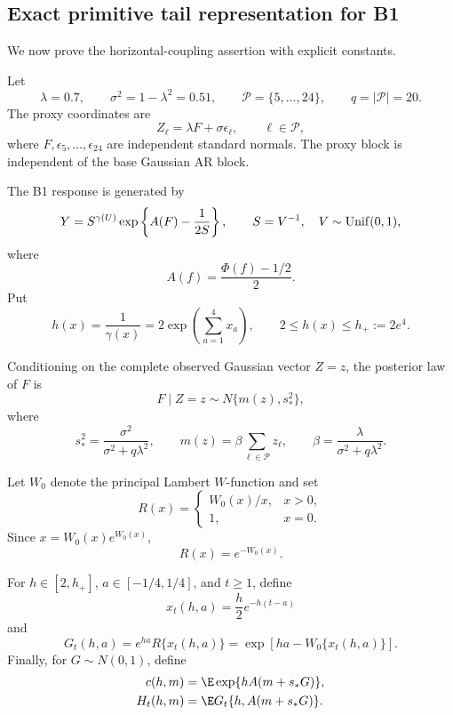 \subsection{Exact primitive tail representation for B1}

We now prove the horizontal-coupling assertion with explicit
constants.

Let
\[
 \lambda=0.7,\qquad
 \sigma^2=1-\lambda^2=0.51,
 \qquad
 \mathcal P=\{5,\ldots,24\},
 \qquad q=|\mathcal P|=20.
\]
The proxy coordinates are
\[
 Z_\ell=\lambda F+\sigma\epsilon_\ell,
 \qquad \ell\in\mathcal P,
\]
where \(F,\epsilon_5,\ldots,\epsilon_{24}\) are independent
standard normals. The proxy block is independent of the base
Gaussian AR block.

The B1 response is generated by
\begin{equation}
 Y
 =
 S^{\gamma(U)}
 \exp\left\{
  A(F)-\frac1{2S}
 \right\},
 \qquad
 S=V^{-1},\quad V\sim{\rm Unif}(0,1),
 \label{eq:B1-generator-rigorous}
\end{equation}
where
\[
 A(f)=\frac{\Phi(f)-1/2}{2}.
\]
Put
\[
 h(x)=\frac1{\gamma(x)}
 =
 2\exp\left(\sum_{a=1}^4x_a\right),
 \qquad
 2\le h(x)\le h_+:=2e^4.
\]

Conditioning on the complete observed Gaussian vector
\(Z=z\), the posterior law of \(F\) is
\begin{equation}
 F\mid Z=z
 \sim N\{m(z),s_*^2\},
 \label{eq:B1-posterior}
\end{equation}
where
\begin{equation}
 s_*^2
 =
 \frac{\sigma^2}{\sigma^2+q\lambda^2},
 \qquad
 m(z)
 =
 \beta\sum_{\ell\in\mathcal P}z_\ell,
 \qquad
 \beta=
 \frac{\lambda}{\sigma^2+q\lambda^2}.
 \label{eq:B1-posterior-parameters}
\end{equation}

Let \(W_0\) denote the principal Lambert \(W\)-function and set
\[
 R(x)=
 \begin{cases}
  W_0(x)/x,&x>0,\\
  1,&x=0.
 \end{cases}
\]
Since \(x=W_0(x)e^{W_0(x)}\),
\begin{equation}
 R(x)=e^{-W_0(x)}.
 \label{eq:Lambert-ratio}
\end{equation}

For \(h\in[2,h_+]\), \(a\in[-1/4,1/4]\), and \(t\ge1\), define
\begin{equation}
 x_t(h,a)
 =
 \frac h2e^{-h(t-a)}
 \label{eq:B1-x}
\end{equation}
and
\begin{equation}
 G_t(h,a)
 =
 e^{ha}R\{x_t(h,a)\}
 =
 \exp\left[
  ha-W_0\{x_t(h,a)\}
 \right].
 \label{eq:B1-G}
\end{equation}
Finally, for \(G\sim N(0,1)\), define
\begin{align}
 c(h,m)
 &=
 \E\exp\{hA(m+s_*G)\},
 \label{eq:B1-c-hm}\\
 H_t(h,m)
 &=
 \E G_t\{h,A(m+s_*G)\}.
 \label{eq:B1-H-hm}
\end{align}

